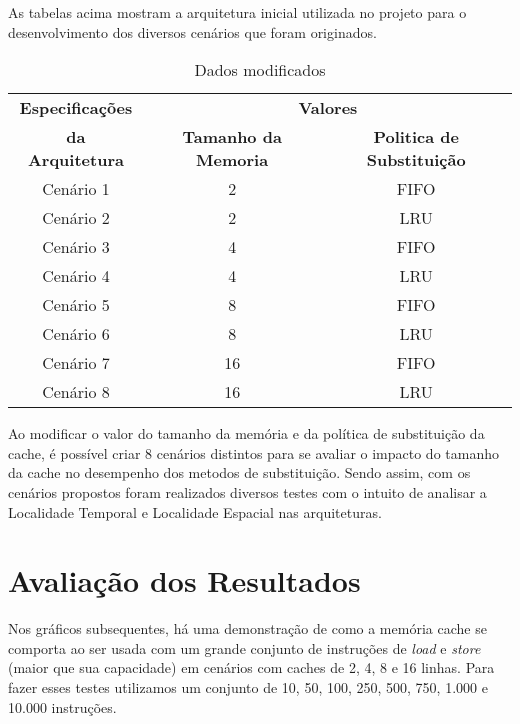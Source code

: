 \documentclass[conference]{IEEEtran}
\begin{document}
As tabelas acima mostram a arquitetura inicial utilizada no projeto para o 
desenvolvimento dos diversos cenários que foram originados.    

\begin{table}[H]
  \caption{Dados modificados}
  \centering
      \begin{tabular}{|c|c|c|}
          \hline
          \textbf{Especificações} & \multicolumn{2}{|c|}{\textbf{Valores}} \\
          \cline{2-3} 
          \textbf{da Arquitetura} & \textbf{Tamanho da Memoria} & \textbf{Politica de Substituição} \\
          \hline
          Cenário 1 & 2 & FIFO \\
          \hline
          Cenário 2 & 2 & LRU \\
          \hline
          Cenário 3 & 4 & FIFO\\
          \hline
          Cenário 4 & 4 & LRU\\
          \hline
          Cenário 5 & 8 & FIFO\\
          \hline
          Cenário 6 & 8 & LRU\\
          \hline
          Cenário 7 & 16 & FIFO\\
          \hline
          Cenário 8 & 16 & LRU\\
          \hline
      \end{tabular}
      \label{tab3}
\end{table}

Ao modificar o valor do tamanho da memória e da política de substituição da cache,
é possível criar 8 cenários distintos para se avaliar o impacto do tamanho da cache
no desempenho dos metodos de substituição. Sendo assim, com os cenários propostos
foram realizados diversos testes com o intuito de analisar a Localidade Temporal e 
Localidade Espacial nas arquiteturas.

\section{Avaliação dos Resultados}


Nos gráficos subsequentes, há uma demonstração de como a memória cache se comporta 
ao ser usada com um grande conjunto de instruções de \emph{load} e \emph{store} 
(maior que sua capacidade) em cenários com caches de 2, 4, 8 e 16 linhas.
Para fazer esses testes utilizamos um conjunto de 10, 50, 100, 250, 500, 750, 1.000 e 10.000 
instruções.
\end{document}

